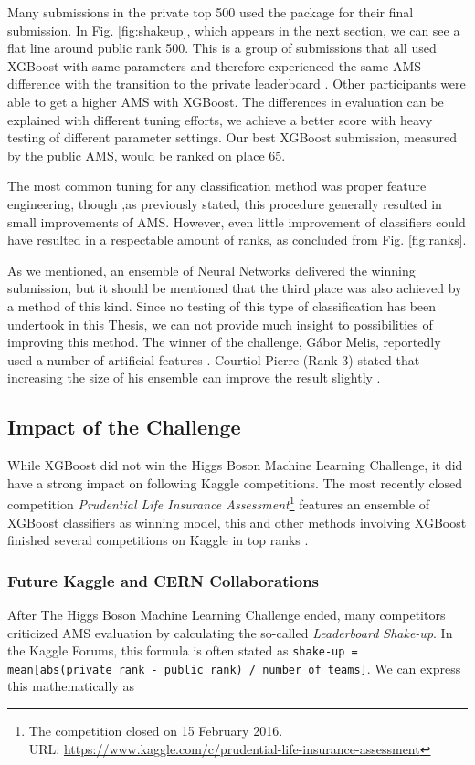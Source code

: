 Many submissions in the private top 500 used the package for their final submission. In Fig. \ref{fig:shakeup}, which appears in the next section, we can see a flat line around public rank 500. This is a group of submissions that all used XGBoost with same parameters and therefore experienced the same AMS difference with the transition to the private leaderboard \cite{hebert}.
Other participants were able to get a higher AMS with XGBoost. The differences in evaluation can be explained with different tuning efforts, we achieve a better score with heavy testing of different parameter settings. Our best XGBoost submission, measured by the public AMS, would be ranked on place 65.

The most common tuning for any classification method was proper feature engineering, though ,as previously stated, this procedure generally resulted in small improvements of AMS. However, even little improvement of classifiers could have resulted in a respectable amount of ranks, as concluded from Fig. \ref{fig:ranks}.

As we mentioned, an ensemble of Neural Networks delivered the winning submission, but it should be mentioned that the third place was also achieved by a method of this kind.
Since no testing of this type of classification has been undertook in this Thesis, we can not provide much insight to possibilities of improving this method. The winner of the challenge, Gábor Melis, reportedly used a number of artificial features \cite{meli14}. Courtiol Pierre (Rank 3) stated that increasing the size of his ensemble can improve the result slightly \cite{courtiol-3rd}.

\subsection{Impact of the Challenge}
While XGBoost did not win the Higgs Boson Machine Learning Challenge, it did have a strong impact on following Kaggle competitions. The most recently closed competition \emph{Prudential Life Insurance Assessment}\footnote{The competition closed on 15 February 2016.\\ URL: \url{https://www.kaggle.com/c/prudential-life-insurance-assessment}} features an ensemble of XGBoost classifiers as winning model, this and other methods involving XGBoost finished several competitions on Kaggle in top ranks \cite{xgbdoc}.

\subsubsection{Future Kaggle and CERN Collaborations}
After The Higgs Boson Machine Learning Challenge ended, many competitors criticized AMS evaluation by calculating the so-called \emph{Leaderboard Shake-up}. In the Kaggle Forums, this formula is often stated as \texttt{shake-up = mean[abs(private\_rank - public\_rank) / number\_of\_teams]}. We can express this mathematically as

